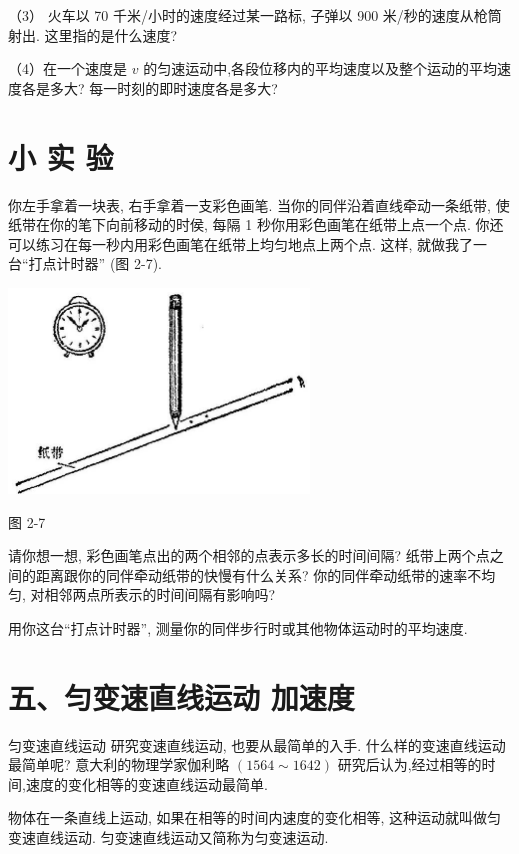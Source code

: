 \documentclass[10pt]{article}
\begin{document}
（3） 火车以 70 千米/小时的速度经过某一路标, 子弹以 900 米/秒的速度从枪筒射出. 这里指的是什么速度?

（4）在一个速度是 \(v\) 的匀速运动中,各段位移内的平均速度以及整个运动的平均速度各是多大? 每一时刻的即时速度各是多大?

\section*{小 实 验}

你左手拿着一块表, 右手拿着一支彩色画笔. 当你的同伴沿着直线牵动一条纸带, 使纸带在你的笔下向前移动的时侯, 每隔 1 秒你用彩色画笔在纸带上点一个点. 你还可以练习在每一秒内用彩色画笔在纸带上均匀地点上两个点. 这样, 就做我了一台“打点计时器” (图 2-7).

\begin{center}
\includegraphics[max width=0.6\textwidth]{images/01912d55-147c-70aa-b0e0-1782a122f948_66_150944.jpg}
\end{center}

图 2-7

请你想一想, 彩色画笔点出的两个相邻的点表示多长的时间间隔? 纸带上两个点之间的距离跟你的同伴牵动纸带的快慢有什么关系? 你的同伴牵动纸带的速率不均匀, 对相邻两点所表示的时间间隔有影响吗?

用你这台“打点计时器”, 测量你的同伴步行时或其他物体运动时的平均速度.

\section*{五、匀变速直线运动 加速度}

匀变速直线运动 研究变速直线运动, 也要从最简单的入手. 什么样的变速直线运动最简单呢? 意大利的物理学家伽利略 \(\left( {{1564} \sim {1642}}\right)\) 研究后认为,经过相等的时间,速度的变化相等的变速直线运动最简单.

物体在一条直线上运动, 如果在相等的时间内速度的变化相等, 这种运动就叫做匀变速直线运动. 匀变速直线运动又简称为匀变速运动.
\end{document}

